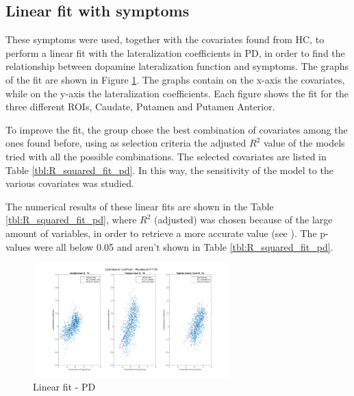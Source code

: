 \documentclass[]{article}
\begin{document}
\begin{multicols}{2}

\subsection{Linear fit with symptoms}

These symptoms were used, together with the covariates found from HC, to perform a linear fit with the lateralization coefficients in PD, in order to find the relationship between dopamine lateralization function and symptoms. The graphs of the fit are shown in Figure \ref{fig:lin_fit_pd}. The graphs contain on the x-axis the covariates, while on the y-axis the lateralization coefficients. Each figure shows the fit for the three different ROIs, Caudate, Putamen and Putamen Anterior. 

To improve the fit, the group chose the best combination of covariates among the ones found before, using as selection criteria the adjusted $R^2$ value of the models tried with all the possible combinations. The selected covariates are listed in Table \ref{tbl:R_squared_fit_pd}. 
In this way, the sensitivity of the model to the various covariates was studied.

The numerical results of these linear fits are shown in the Table \ref{tbl:R_squared_fit_pd}, where $R^2$ (adjusted) was chosen because of the large amount of variables, in order to retrieve a more accurate value (see \cite{analysis_of_covariance_and_alternatives}). The p-values were all below 0.05 and aren't shown in Table \ref{tbl:R_squared_fit_pd}.

\end{multicols}

\begin{figure}[h]
	\centering
	\includegraphics[width=3in]{../fit_covariates_pd}
	\caption{Linear fit - PD}
	\label{fig:lin_fit_pd}
\end{figure} 
\end{document}
